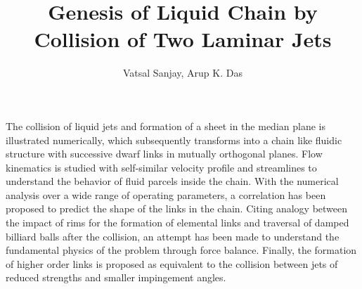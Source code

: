 \documentclass{jfm}
\title{Genesis of Liquid Chain by Collision of Two Laminar Jets}
\author{Vatsal Sanjay,
  Arup K. Das\corresp{\email{arupdas80@gmail.com}}}
\affiliation{Department of Mechanical and Industrial Engineering, Indian Institute of Technology, Roorkee}
\begin{document}
\newcommand{\MarkerCircleRed}{\raisebox{0.5pt}{\tikz{\node[draw,scale=0.4,circle,fill=red!100!red](){};}}}
\newcommand{\MarkerSquareRed}{\raisebox{0.5pt}{\tikz{\node[draw,scale=0.4,regular polygon, regular polygon sides=4,fill=black!20!red](){};}}}
\newcommand{\MarkerDiamondBlack}{\raisebox{0pt}{\tikz{\node[draw,scale=0.4,diamond,fill=black!100!](){};}}}
\newcommand{\MarkerSquareEmpty}{\raisebox{0pt}{\tikz{\node[draw,scale=0.4,regular polygon, regular polygon sides=4](){};}}}
\newcommand{\MarkerCircleEmpty}{\raisebox{0pt}{\tikz{\node[draw,scale=0.4,circle](){};}}}
\maketitle
\begin{abstract}
\end{abstract}
The collision of liquid jets and formation of a sheet in the median plane is illustrated numerically, which subsequently transforms into a chain like fluidic structure with successive dwarf links in mutually orthogonal planes. Flow kinematics is studied with self-similar velocity profile and streamlines to understand the behavior of fluid parcels inside the chain. With the numerical analysis over a wide range of operating parameters, a correlation has been proposed to predict the shape of the links in the chain. Citing analogy between the impact of rims for the formation of elemental links and traversal of damped billiard balls after the collision, an attempt has been made to understand the fundamental physics of the problem through force balance. Finally, the formation of higher order links is proposed as equivalent to the collision between jets of reduced strengths and smaller impingement angles.
\begin{keywords}
\end{keywords}
\end{document}
